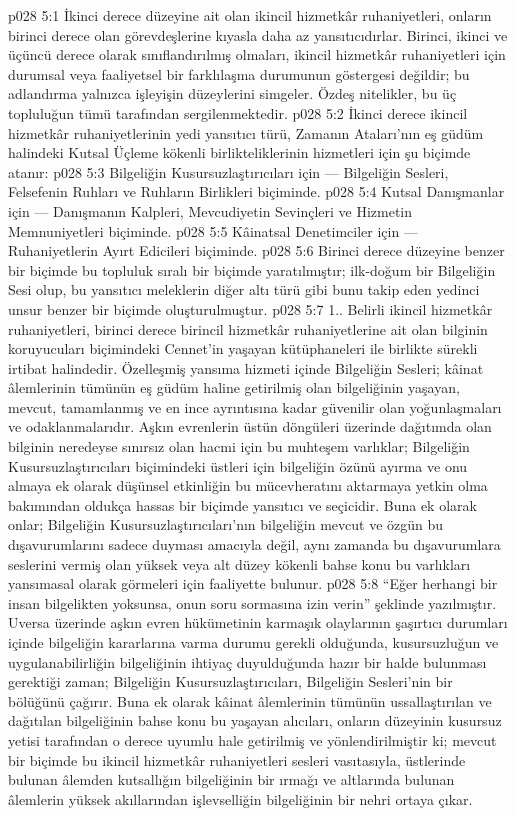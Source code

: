 \vs p028 5:1 İkinci derece düzeyine ait olan ikincil hizmetkâr ruhaniyetleri, onların birinci derece olan görevdeşlerine kıyasla daha az yansıtıcıdırlar. Birinci, ikinci ve üçüncü derece olarak sınıflandırılmış olmaları, ikincil hizmetkâr ruhaniyetleri için durumsal veya faaliyetsel bir farklılaşma durumunun göstergesi değildir; bu adlandırma yalnızca işleyişin düzeylerini simgeler. Özdeş nitelikler, bu üç topluluğun tümü tarafından sergilenmektedir.
\vs p028 5:2 İkinci derece ikincil hizmetkâr ruhaniyetlerinin yedi yansıtıcı türü, Zamanın Ataları’nın eş güdüm halindeki Kutsal Üçleme kökenli birlikteliklerinin hizmetleri için şu biçimde atanır:
\vs p028 5:3 Bilgeliğin Kusursuzlaştırıcıları için --- Bilgeliğin Sesleri, Felsefenin Ruhları ve Ruhların Birlikleri biçiminde.
\vs p028 5:4 Kutsal Danışmanlar için --- Danışmanın Kalpleri, Mevcudiyetin Sevinçleri ve Hizmetin Memnuniyetleri biçiminde.
\vs p028 5:5 Kâinatsal Denetimciler için --- Ruhaniyetlerin Ayırt Edicileri biçiminde.
\vs p028 5:6 Birinci derece düzeyine benzer bir biçimde bu topluluk sıralı bir biçimde yaratılmıştır; ilk\hyp{}doğum bir Bilgeliğin Sesi olup, bu yansıtıcı meleklerin diğer altı türü gibi bunu takip eden yedinci unsur benzer bir biçimde oluşturulmuştur.
\vs p028 5:7 1.\bibnobreakspace {}. Belirli ikincil hizmetkâr ruhaniyetleri, birinci derece birincil hizmetkâr ruhaniyetlerine ait olan bilginin koruyucuları biçimindeki Cennet’in yaşayan kütüphaneleri ile birlikte sürekli irtibat halindedir. Özelleşmiş yansıma hizmeti içinde Bilgeliğin Sesleri; kâinat âlemlerinin tümünün eş güdüm haline getirilmiş olan bilgeliğinin yaşayan, mevcut, tamamlanmış ve en ince ayrıntısına kadar güvenilir olan yoğunlaşmaları ve odaklanmalarıdır. Aşkın evrenlerin üstün döngüleri üzerinde dağıtımda olan bilginin neredeyse sınırsız olan hacmi için bu muhteşem varlıklar; Bilgeliğin Kusursuzlaştırıcıları biçimindeki üstleri için bilgeliğin özünü ayırma ve onu almaya ek olarak düşünsel etkinliğin bu mücevheratını aktarmaya yetkin olma bakımından oldukça hassas bir biçimde yansıtıcı ve seçicidir. Buna ek olarak onlar; Bilgeliğin Kusursuzlaştırıcıları’nın bilgeliğin mevcut ve özgün bu dışavurumlarını sadece duyması amacıyla değil, aynı zamanda bu dışavurumlara seslerini vermiş olan yüksek veya alt düzey kökenli bahse konu bu varlıkları yansımasal olarak görmeleri için faaliyette bulunur.
\vs p028 5:8 “Eğer herhangi bir insan bilgelikten yoksunsa, onun soru sormasına izin verin” şeklinde yazılmıştır. Uversa üzerinde aşkın evren hükümetinin karmaşık olaylarının şaşırtıcı durumları içinde bilgeliğin kararlarına varma durumu gerekli olduğunda, kusursuzluğun ve uygulanabilirliğin bilgeliğinin ihtiyaç duyulduğunda hazır bir halde bulunması gerektiği zaman; Bilgeliğin Kusursuzlaştırıcıları, Bilgeliğin Sesleri’nin bir bölüğünü çağırır. Buna ek olarak kâinat âlemlerinin tümünün ussallaştırılan ve dağıtılan bilgeliğinin bahse konu bu yaşayan alıcıları, onların düzeyinin kusursuz yetisi tarafından o derece uyumlu hale getirilmiş ve yönlendirilmiştir ki; mevcut bir biçimde bu ikincil hizmetkâr ruhaniyetleri sesleri vasıtasıyla, üstlerinde bulunan âlemden kutsallığın bilgeliğinin bir ırmağı ve altlarında bulunan âlemlerin yüksek akıllarından işlevselliğin bilgeliğinin bir nehri ortaya çıkar.
